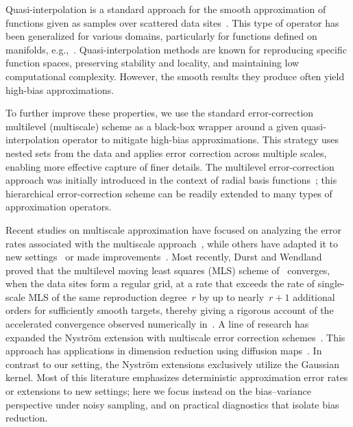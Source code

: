 \documentclass[12pt]{article}
\begin{document}
Quasi-interpolation is a standard approach for the smooth approximation of functions given as samples over scattered data sites~\cite{wendland2004scattered, levin1998approximation}. This type of operator has been generalized for various domains, particularly for functions defined on manifolds, e.g.,~\cite{grohs2017scattered, grohs2020handbook, zimmermann2021manifold, sharon2022multiscale}. Quasi-interpolation methods are known for reproducing specific function spaces, preserving stability and locality, and maintaining low computational complexity. However, the smooth results they produce often yield high-bias approximations.

To further improve these properties, we use the standard error-correction multilevel (multiscale) scheme as a black-box wrapper around a given quasi-interpolation operator to mitigate high-bias approximations. This strategy uses nested sets from the data and applies error correction across multiple scales, enabling more effective capture of finer details. The multilevel error-correction approach was initially introduced in the context of radial basis functions~\cite{floater1996multistep}; this hierarchical error-correction scheme can be readily extended to many types of approximation operators.

Recent studies on multiscale approximation have focused on analyzing the error rates associated with the multiscale approach~\cite{wendland2010multiscale, franz2023multilevel}, while others have adapted it to new settings~\cite{sharon2022multiscale} or made improvements~\cite{le2020multilevel}. Most recently, Durst and Wendland~\cite{durst2026improved} proved that the multilevel moving least squares (MLS) scheme of~\cite{sharon2022multiscale} converges, when the data sites form a regular grid, at a rate that exceeds the rate of single-scale MLS of the same reproduction degree~$r$ by up to nearly~$r+1$ additional orders for sufficiently smooth targets, thereby giving a rigorous account of the accelerated convergence observed numerically in~\cite{sharon2022multiscale}. A line of research has expanded the Nystr\"{o}m extension with multiscale error correction schemes~\cite{bermanis2013multiscale,duchateau2013adaptation}. This approach has applications in dimension reduction using diffusion maps~\cite{rabin2012heterogeneous,chiavazzo2014reduced}. In contrast to our setting, the Nystr\"{o}m extensions exclusively utilize the Gaussian kernel. Most of this literature emphasizes deterministic approximation error rates or extensions to new settings; here we focus instead on the bias--variance perspective under noisy sampling, and on practical diagnostics that isolate bias reduction.
\end{document}
